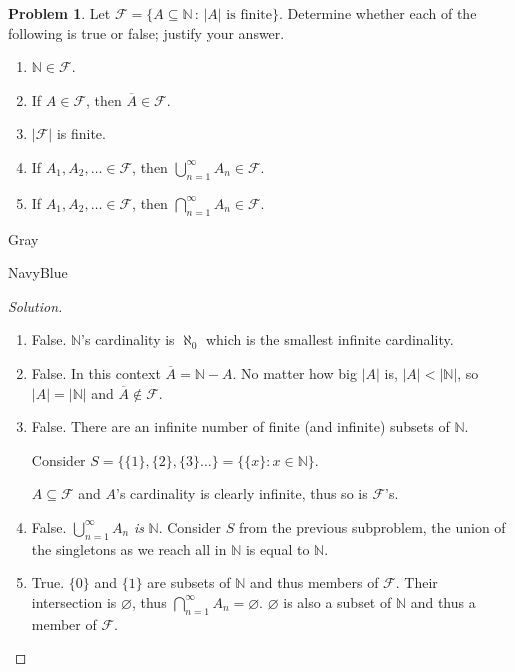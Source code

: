 \documentclass[12pt]{amsart}
\newcounter{problem_number}[section]
\theoremstyle{named}
\newenvironment{soln}
{\begin{color}{Gray}\begin{framed}\begin{color}{NavyBlue}\begin{proof}[Solution]
\doublespacing}
{\end{proof}\end{color}\end{framed}\end{color}}
\theoremstyle{definition}
\newtheorem{problem}{Problem}
\newcommand{\N}{\mathbb N}
\newcommand{\Ff}{\mathcal F}
\begin{document}
\begin{problem}
	Let $\Ff = \{A\subseteq\N\,:\,|A| \text{ is finite}\}$.
	Determine whether each of the following is true or false; justify your answer.
	\begin{enumerate}
		\item $\N\in\Ff$.
		\item If $A\in\Ff$, then $\overline A\in\Ff$.
		\item $|\Ff|$ is finite.
		\item If $A_1, A_2,\ldots \in\Ff$, then $\displaystyle\bigcup_{n=1}^\infty A_n\in\Ff$.
		\item If $A_1, A_2,\ldots \in\Ff$, then $\displaystyle\bigcap_{n=1}^\infty A_n\in\Ff$.
	\end{enumerate}
	
\end{problem}

\begin{soln}
	\phantom{ }
	\begin{enumerate}
		\item False. $\mathbb N$'s cardinality is $\aleph_0$ which is the smallest infinite cardinality.
		\item False. In this context $\overline{A} = \mathbb N - A$. No matter how big $|A|$ is, $|A|
		< |\mathbb N|$, so $|A| = |\mathbb N|$ and $\overline{A} \notin \mathcal F$.
		\item False. There are an infinite number of finite (and infinite) subsets of $\mathbb N$. 
		
		\noindent Consider $S = \{\{1\},\{2\},\{3\}\dots\} = \{\{x\}: x \in \mathbb N\}$.

		\noindent $A \subseteq \mathcal F$ and $A$'s cardinality is clearly infinite, thus so is
		$\mathcal F$'s. 

		\item False. $\displaystyle\bigcup_{n=1}^\infty A_n$ \textit{is} $\mathbb N$. Consider $S$
		from the previous subproblem, the union of the singletons as we reach all in $\mathbb N$ is
		equal to $\mathbb N$. 
		
		\item True. $\{0\}$ and $\{1\}$ are subsets of $\mathbb N$ and thus members of $\mathcal F$.
		Their intersection is $\varnothing$, thus $\displaystyle\bigcap_{n=1}^\infty A_n = \varnothing$.
		$\varnothing$ is also a subset of $\mathbb N$ and thus a member of $\mathcal F$.  
	\end{enumerate}
\end{soln}
\end{document}
